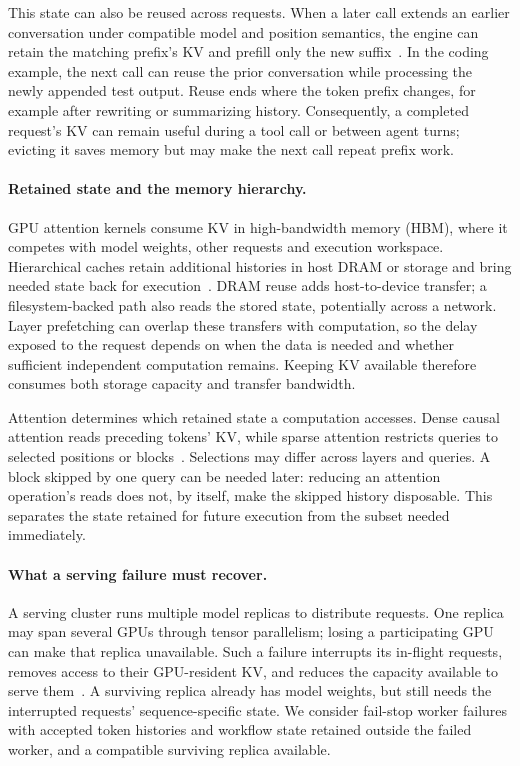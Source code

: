 This state can also be reused across requests. When a later call extends
an earlier conversation under compatible model and position semantics,
the engine can retain the matching prefix's KV and prefill only the new
suffix~\cite{gao2024cachedattention,zheng2024sglang}. In the coding example,
the next call can reuse the prior conversation while processing the newly
appended test output. Reuse ends where the token prefix changes, for
example after rewriting or summarizing history. Consequently, a completed
request's KV can remain useful during a tool call or between agent turns;
evicting it saves memory but may make the next call repeat prefix work.

\paragraph{Retained state and the memory hierarchy.}
GPU attention kernels consume KV in high-bandwidth memory (HBM), where
it competes with model weights, other requests and execution workspace.
Hierarchical caches retain additional histories in host DRAM or storage
and bring needed state back for execution~\cite{qin2025mooncake,gao2024cachedattention}.
DRAM reuse adds host-to-device transfer; a filesystem-backed path also
reads the stored state, potentially across a network. Layer prefetching
can overlap these transfers with computation, so the delay exposed to
the request depends on when the data is needed and whether sufficient
independent computation remains. Keeping KV available therefore consumes
both storage capacity and transfer bandwidth.

Attention determines which retained state a computation accesses. Dense
causal attention reads preceding tokens' KV, while sparse attention
restricts queries to selected positions or blocks~\cite{jiang2024minference}.
Selections may differ across layers and queries. A block skipped by one
query can be needed later: reducing an attention operation's reads does
not, by itself, make the skipped history disposable. This separates the
state retained for future execution from the subset needed immediately.

\paragraph{What a serving failure must recover.}
A serving cluster runs multiple model replicas to distribute requests.
One replica may span several GPUs through tensor parallelism; losing a
participating GPU can make that replica unavailable. Such a failure
interrupts its in-flight requests, removes access to their GPU-resident
KV, and reduces the capacity available to serve them~\cite{cao2026lumen}.
A surviving replica already has model weights, but still needs the
interrupted requests' sequence-specific state. We consider fail-stop
worker failures with accepted token histories and workflow state retained
outside the failed worker, and a compatible surviving replica available.

